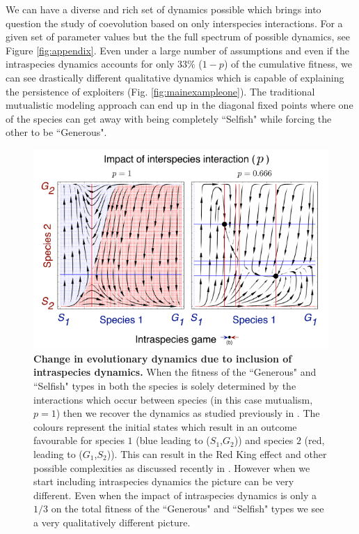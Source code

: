\documentclass[12pt]{article}
\begin{document}
We can have a diverse and rich set of dynamics possible which brings into question the study of coevolution based on only interspecies interactions. 
For a given set of parameter values but the the full spectrum of possible dynamics, see Figure \ref{fig:appendix}.
Even under a large number of assumptions and even if the intraspecies dynamics accounts for only $33\%$ ($1-p$) of the cumulative fitness, we can see drastically different qualitative dynamics which is capable of explaining the persistence of exploiters (Fig. \ref{fig:mainexampleone}).
The traditional mutualistic modeling approach can end up in the diagonal fixed points where one of the species can get away with being completely ``Selfish" while forcing the other to be ``Generous".


\begin{figure}
\begin{center}
\includegraphics[width=\columnwidth]{Figures/mainexample2.pdf}
\caption{\small{
\textbf{Change in evolutionary dynamics due to inclusion of intraspecies dynamics.} When the fitness of the ``Generous" and ``Selfish" types in both the species is solely determined by the interactions which occur between species (in this case mutualism, $p=1$) then we recover the dynamics as studied previously in \citep{gokhale:PRSB:2012}. The colours represent the initial states which result in an outcome favourable for species $1$ (blue leading to ($S_1$,$G_2$)) and species $2$ (red, leading to ($G_1$,$S_2$)). This can result in the Red King effect and other possible complexities as discussed recently in \citep{gao:SciRep:2015}. However when we start including intraspecies dynamics the picture can be very different.
Even when the impact of intraspecies dynamics is only a $1/3$ on the total fitness of the ``Generous" and ``Selfish" types we see a very qualitatively different picture.
}}
\end{center}
\end{figure}
\end{document}
